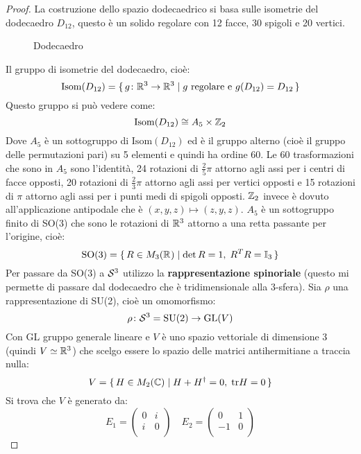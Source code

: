 \begin{proof}
  La costruzione dello spazio dodecaedrico si basa sulle isometrie del dodecaedro $ D_{12} $,
  questo è un solido regolare con 12 facce, 30 spigoli e 20 vertici.
  \begin{figure*}[htbp]
    \centering
    \def\svgwidth{0.26\textwidth}
    
    \caption{Dodecaedro}
  \end{figure*}

  \noindent
  Il gruppo di isometrie del dodecaedro, cioè:
  \[
    \mathrm{Isom}(D_{12}) = \set{ g \colon \mathbb{R}^{3} \to \mathbb{R}^{3} | g \text{ regolare e } g(D_{12}) = D_{12}}
  \]
  Questo gruppo si può vedere come:
  \[
    \mathrm{Isom}(D_{12}) \cong A_5 \times \mathbb{Z}_2
  \]
  Dove $ A_5 $ è un sottogruppo di $ \mathrm{Isom}(D_{12}) $ ed è il gruppo
  alterno (cioè il gruppo delle permutazioni pari) su 5 elementi e quindi ha ordine 60.
  Le 60 trasformazioni che sono in $ A_5 $ sono l'identità, 24 rotazioni di $ \frac{2}{5} \pi $ attorno
  agli assi per i centri di facce opposti, 20 rotazioni di $ \frac{2}{3} \pi $ attorno
  agli assi per vertici opposti e 15 rotazioni di $ \pi $ attorno agli assi per
  i punti medi di spigoli opposti.
  $ \mathbb{Z}_2 $ invece è dovuto all'applicazione antipodale che è $ (x,y,z) \mapsto (z,y,z) $.
  $ A_5 $ è un sottogruppo finito di SO(3) che sono le rotazioni di $ \mathbb{R}^{3} $ attorno
  a una retta passante per l'origine, cioè:
  \[
    \mathrm{SO(3)} = \set{ R \in M_3(\mathbb{R}^{}) | \det{R} = 1, \;R^T R = \mathbb{I}_{3}}
  \]
  Per passare da SO(3) a $ \mathcal{S}^{3} $ utilizzo la \textbf{rappresentazione spinoriale}
  (questo mi permette di passare dal dodecaedro che è tridimensionale alla $ 3 $-sfera).
  Sia $ \rho $ una rappresentazione di SU(2), cioè un omomorfismo:
  \[
    \rho \colon \mathcal{S}^{3} = \mathrm{SU(2)} \to \mathrm{GL}(V)
  \]
  Con GL gruppo generale lineare e $ V $ è uno spazio vettoriale di dimensione
  3 (quindi $ V \simeq \mathbb{R}^{3} $) che scelgo essere lo spazio delle matrici antihermitiane a
  traccia nulla:
  \[
    V = \set{H \in M_2(\mathbb{C}) | H + H^\dagger = 0, \; \mathrm{tr}H  = 0}
  \]
  Si trova che $ V $ è generato da:
  \[
    E_1 =
    \begin{pmatrix}
      0 & i \\
      i & 0 \\
    \end{pmatrix}
    \quad
    E_2 =
    \begin{pmatrix}
      0 & 1 \\
      -1 & 0 \\
    \end{pmatrix}
\]
\end{proof}
